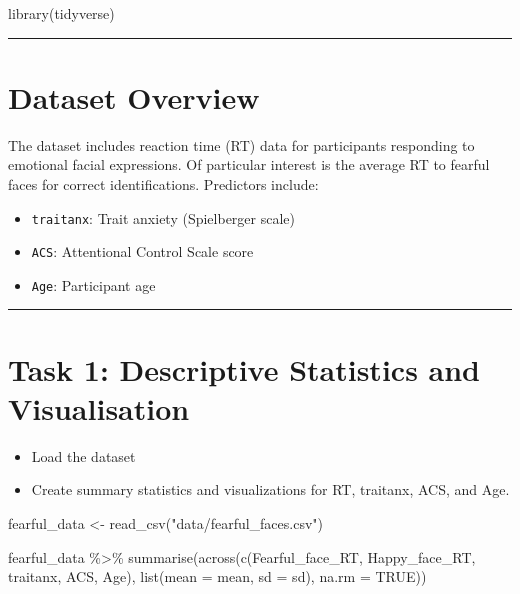 \documentclass[
  letterpaper,
  DIV=11,
  numbers=noendperiod]{scrreprt}
\newenvironment{Shaded}{\begin{snugshade}}{\end{snugshade}}
\newcommand{\AttributeTok}[1]{\textcolor[rgb]{0.40,0.45,0.13}{#1}}
\newcommand{\ConstantTok}[1]{\textcolor[rgb]{0.56,0.35,0.01}{#1}}
\newcommand{\FunctionTok}[1]{\textcolor[rgb]{0.28,0.35,0.67}{#1}}
\newcommand{\NormalTok}[1]{\textcolor[rgb]{0.00,0.23,0.31}{#1}}
\newcommand{\OtherTok}[1]{\textcolor[rgb]{0.00,0.23,0.31}{#1}}
\newcommand{\SpecialCharTok}[1]{\textcolor[rgb]{0.37,0.37,0.37}{#1}}
\newcommand{\StringTok}[1]{\textcolor[rgb]{0.13,0.47,0.30}{#1}}
\providecommand{\tightlist}{%
  \setlength{\itemsep}{0pt}\setlength{\parskip}{0pt}}\usepackage{longtable,booktabs,array}
\begin{document}
\begin{Shaded}
\begin{Highlighting}[]
\FunctionTok{library}\NormalTok{(tidyverse)}
\end{Highlighting}
\end{Shaded}

\begin{center}\rule{0.5\linewidth}{0.5pt}\end{center}

\section{Dataset Overview}\label{dataset-overview}

The dataset includes reaction time (RT) data for participants responding
to emotional facial expressions. Of particular interest is the average
RT to fearful faces for correct identifications. Predictors include:

\begin{itemize}
\tightlist
\item
  \texttt{traitanx}: Trait anxiety (Spielberger scale)
\item
  \texttt{ACS}: Attentional Control Scale score
\item
  \texttt{Age}: Participant age
\end{itemize}

\begin{center}\rule{0.5\linewidth}{0.5pt}\end{center}

\section{Task 1: Descriptive Statistics and
Visualisation}\label{task-1-descriptive-statistics-and-visualisation}

\begin{itemize}
\tightlist
\item
  Load the dataset
\item
  Create summary statistics and visualizations for RT, traitanx, ACS,
  and Age.
\end{itemize}

\begin{Shaded}
\begin{Highlighting}[]
\NormalTok{fearful\_data }\OtherTok{\textless{}{-}} \FunctionTok{read\_csv}\NormalTok{(}\StringTok{"data/fearful\_faces.csv"}\NormalTok{)}

\NormalTok{fearful\_data }\SpecialCharTok{\%\textgreater{}\%}
  \FunctionTok{summarise}\NormalTok{(}\FunctionTok{across}\NormalTok{(}\FunctionTok{c}\NormalTok{(Fearful\_face\_RT, Happy\_face\_RT, traitanx, ACS, Age), }\FunctionTok{list}\NormalTok{(}\AttributeTok{mean =}\NormalTok{ mean, }\AttributeTok{sd =}\NormalTok{ sd), }\AttributeTok{na.rm =} \ConstantTok{TRUE}\NormalTok{))}
\end{Highlighting}
\end{Shaded}
\end{document}
